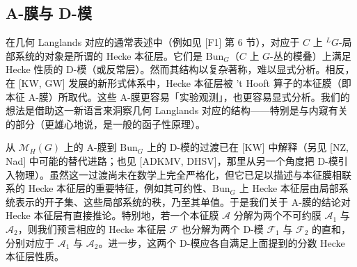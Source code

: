 \documentclass[11pt,a4paper]{article}
\newcommand{\Bun}{\mathrm{Bun}}
\begin{document}

\subsection{A-膜与 D-模}

在几何 Langlands 对应的通常表述中（例如见 [F1] 第 6 节），对应于 $C$ 上 ${}^{L}G$-局部系统的对象是所谓的 Hecke 本征层。它们是 $\Bun_G$（$C$ 上 $G$-丛的模叠）上满足 Hecke 性质的 D-模（或反常层）。然而其结构以复杂著称，难以显式分析。相反，在 [KW, GW] 发展的新形式体系中，Hecke 本征层被 't Hooft 算子的本征膜（即本征 A-膜）所取代。这些 A-膜更容易「实验观测」，也更容易显式分析。我们的想法是借助这一新语言来洞察几何 Langlands 对应的结构——特别是与内窥有关的部分（更雄心地说，是一般的函子性原理）。

从 $\mathcal{M}_H(G)$ 上的 A-膜到 $\Bun_G$ 上的 D-模的过渡已在 [KW] 中解释（另见 [NZ, Nad] 中可能的替代进路；也见 [ADKMV, DHSV]，那里从另一个角度把 D-模引入物理）。虽然这一过渡尚未在数学上完全严格化，但它已足以描述与本征膜相联系的 Hecke 本征层的重要特征，例如其可约性、$\Bun_G$ 上 Hecke 本征层由局部系统表示的开子集、这些局部系统的秩，乃至其单值。于是我们关于 A-膜的结论对 Hecke 本征层有直接推论。特别地，若一个本征膜 $\mathcal{A}$ 分解为两个不可约膜 $\mathcal{A}_1$ 与 $\mathcal{A}_2$，则我们预言相应的 Hecke 本征层 $\mathcal{F}$ 也分解为两个 D-模 $\mathcal{F}_1$ 与 $\mathcal{F}_2$ 的直和，分别对应于 $\mathcal{A}_1$ 与 $\mathcal{A}_2$。进一步，这两个 D-模应各自满足上面提到的分数 Hecke 本征层性质。

\end{document}
